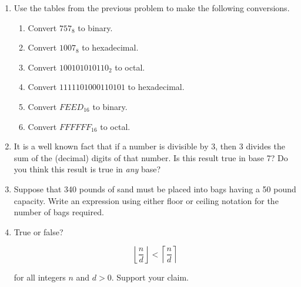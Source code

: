 \begin{enumerate}
{\vfill

}

\hintspagebreak
\workbookpagebreak
\textbookpagebreak

\item Use the tables from the previous problem to make the following conversions.

\begin{enumerate}
\item Convert $757_8$ to binary.
\item Convert $1007_8$ to hexadecimal.
\item Convert $100101010110_2$ to octal.
\item Convert $1111101000110101$ to hexadecimal.
\item Convert $FEED_{16}$ to binary.
\item Convert $FFFFFF_{16}$ to octal.
\end{enumerate}


\item It is a well known fact that if a number is divisible by 3, then 3
  divides the sum of the (decimal) digits of that number.  Is this
  result true in base 7?  Do you think this result is true in {\em
  any} base? 
 
 \wbvfill
 

\item Suppose that 340 pounds of sand must be placed into bags having
  a 50 pound capacity.  Write an expression using either floor or
  ceiling notation for the number of bags required.

\wbvfill


\item True or false? 

\[ \left\lfloor \frac{n}{d}\right\rfloor < \left\lceil \frac{n}{d}\right\rceil \]
 
\noindent for all integers $n$ and $d>0$. Support your claim.

\wbvfill



\end{enumerate}
